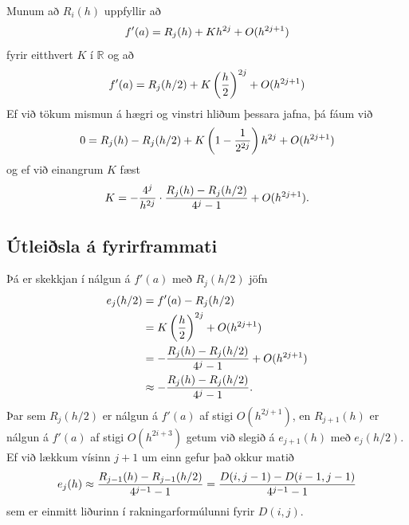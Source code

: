 \documentclass[A4paper,10pt,icelandic]{sphinxmanual}
\begin{document}
Munum að \(R_i(h)\) uppfyllir að
\begin{gather}
\begin{split}f'(a) = R_j(h) + Kh^{2j} + O(h^{2j+1})\end{split}\notag
\end{gather}
fyrir eitthvert \(K\) í \(\mathbb R\) og að
\begin{gather}
\begin{split}f'(a) = R_j(h/2) + K \left( \frac{h}{2} \right)^{2j}
  + O(h^{2j+1})\end{split}\notag
\end{gather}
Ef við tökum mismun á hægri og vinstri hliðum þessara jafna, þá fáum við
\begin{gather}
\begin{split}0 = R_j(h) - R_j(h/2) + K \left(1 - \frac{1}{2^{2j}}\right)h^{2j}
  + O(h^{2j+1})\end{split}\notag
\end{gather}
og ef við einangrum \(K\) fæst
\begin{gather}
\begin{split}K = -\frac{4^{j}}{h^{2j}} \cdot \frac{R_j(h)-R_j(h/2)}{4^{j}-1} +
O(h^{2j+1}).\end{split}\notag
\end{gather}

\subsection{Útleiðsla á fyrirframmati}
\label{kafli04:utleisla-a-fyrirframmati}
Þá er skekkjan í nálgun á \(f'(a)\) með \(R_j(h/2)\) jöfn
\begin{gather}
\begin{split}\begin{aligned}
  e_j(h/2) &= f'(a) - R_j(h/2) \\
  &= K\left(\frac{h}{2}\right)^{2j} + O(h^{2j+1}) \\
  &= -\frac{R_j(h)-R_j(h/2)}{4^{j}-1} + O(h^{2j+1}) \\
  &\approx -\frac{R_j(h)-R_j(h/2)}{4^{j}-1}.\end{aligned}\end{split}\notag
\end{gather}
Þar sem \(R_j(h/2)\) er nálgun á \(f'(a)\) af stigi
\(O(h^{2j+1})\), en \(R_{j+1}(h)\) er nálgun á \(f'(a)\) af
stigi \(O(h^{2i+3})\) getum við slegið á \(e_{j+1}(h)\) með
\(e_j(h/2)\). Ef við lækkum vísinn \(j+1\) um einn gefur það
okkur matið
\begin{gather}
\begin{split}e_j(h) \approx \frac{R_{j-1}(h)-R_{j-1}(h/2)}{4^{j-1}-1} =
  \frac{D(i,j-1)-D(i-1,j-1)}{4^{j-1}-1}\end{split}\notag
\end{gather}
sem er einmitt liðurinn í rakningarformúlunni fyrir \(D(i,j)\).
\end{document}
